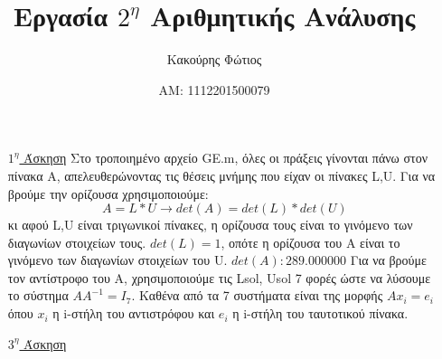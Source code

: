 \documentclass[12pt]{article}
\begin{document}
\title{Εργασία $2^\eta$ Αριθμητικής Ανάλυσης}
\date{ΑΜ: 1112201500079}
\author{Κακούρης Φώτιος}
\maketitle{}
    
\begin{enumerate}
    \item[\underline{$1^\eta$ Άσκηση}] Στο τροποιημένο αρχείο \textlatin{GE.m}, όλες οι πράξεις γίνονται πάνω στον πίνακα Α, 
    απελευθερώνοντας τις θέσεις μνήμης που είχαν οι πίνακες \textlatin{L,U}. \newline
    Για να βρούμε την ορίζουσα χρησιμοποιούμε: $$ A=L*U \rightarrow det(A)=det(L)*det(U) $$ κι αφού \textlatin{L,U} είναι τριγωνικοί πίνακες, η ορίζουσα τους είναι 
    το γινόμενο των διαγωνίων στοιχείων τους. $det(L)=1$, οπότε η ορίζουσα του Α είναι το γινόμενο των διαγωνίων στοιχείων του \textlatin{U}.  $det(A): 289.000000$ \newline
    Για να βρούμε τον αντίστροφο του Α, χρησιμοποιούμε τις \textlatin{Lsol, Usol} 7 φορές ώστε να λύσουμε το σύστημα $ AΑ^{-1} = I_7 $. Καθένα από τα 7 συστήματα είναι 
    της μορφής $A x_i = e_i $ όπου $x_i$ η \textlatin{i}-στήλη του αντιστρόφου και $e_i$ η \textlatin{i}-στήλη του ταυτοτικού πίνακα.


    \item[\underline{$3^\eta$ Άσκηση}]  
 


\end{enumerate}
\end{document}
